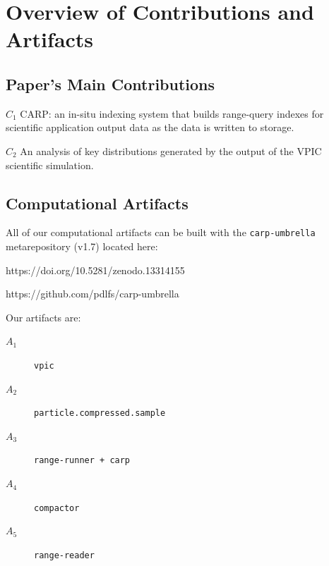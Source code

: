 \documentclass[conference]{IEEEtran}
\begin{document}


\appendixAD

\section{Overview of Contributions and Artifacts}

\subsection{Paper's Main Contributions}

\begin{description}
    \item{$C_1$} CARP: an in-situ indexing system that builds range-query indexes for scientific application output data as the data is written to storage.
    \item{$C_2$} An analysis of key distributions generated by the output of the VPIC scientific simulation.
\end{description}


\subsection{Computational Artifacts}

All of our computational artifacts can be built with the \texttt{carp-umbrella} metarepository (v1.7) located here:
\begin{description}[style=nextline, leftmargin=1.5cm, labelsep=0.0cm]
    \item[Zenodo:] https://doi.org/10.5281/zenodo.13314155
    \item[Github:] https://github.com/pdlfs/carp-umbrella
\end{description}

Our artifacts are:
\begin{description}
    \item[$A_1$] \texttt{vpic}
    \item[$A_2$] \texttt{particle.compressed.sample}
    \item[$A_3$] \texttt{range-runner + carp}
    \item[$A_4$] \texttt{compactor}
    \item[$A_5$] \texttt{range-reader}
\end{description}
\end{document}
